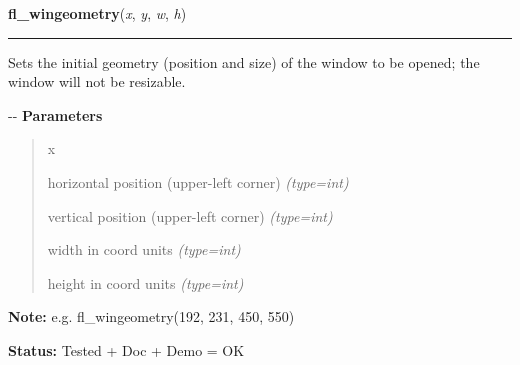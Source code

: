 \hspace{.8\funcindent}\begin{boxedminipage}{\funcwidth}

    \raggedright \textbf{fl\_wingeometry}(\textit{x}, \textit{y}, \textit{w}, \textit{h})

    \vspace{-1.5ex}

    \rule{\textwidth}{0.5\fboxrule}
\setlength{\parskip}{2ex}

Sets the initial geometry (position and size) of the window to be
opened; the window will not be resizable.

-{}-
\setlength{\parskip}{1ex}
      \textbf{Parameters}
      \vspace{-1ex}

      \begin{quote}
        \begin{Ventry}{x}

          \item[x]


horizontal position (upper-left corner)
            {\it (type=int)}

          \item[y]


vertical position (upper-left corner)
            {\it (type=int)}

          \item[w]


width in coord units
            {\it (type=int)}

          \item[h]


height in coord units
            {\it (type=int)}

        \end{Ventry}

      \end{quote}

\textbf{Note:} 
e.g. fl\_wingeometry(192, 231, 450, 550)


\textbf{Status:} 
Tested + Doc + Demo = OK


    \end{boxedminipage}

    \label{xformslib:flxbasic:fl_wingeometry}

    \vspace{0.5ex}

